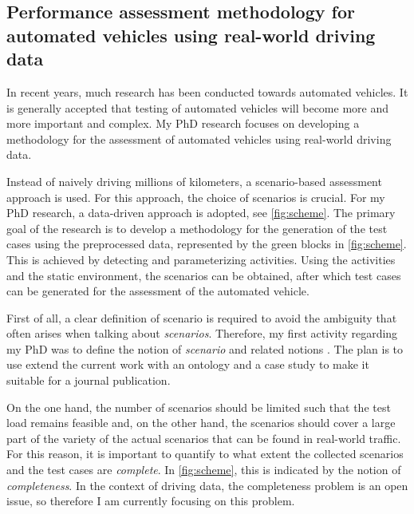 \documentclass[10pt,final,a4paper,oneside,onecolumn]{article}
\begin{document}
\subsection*{Performance assessment methodology for automated vehicles using real-world driving data}

In recent years, much research has been conducted towards automated vehicles. It is generally accepted that testing of automated vehicles will become more and more important and complex. My PhD research focuses on developing a methodology for the assessment of automated vehicles using real-world driving data.

Instead of naively driving millions of kilometers, a scenario-based assessment approach is used. For this approach, the choice of scenarios is crucial. For my PhD research, a data-driven approach is adopted, see \cref{fig:scheme}. The primary goal of the research is to develop a methodology for the generation of the test cases using the preprocessed data, represented by the green blocks in \cref{fig:scheme}. This is achieved by detecting and parameterizing activities. Using the activities and the static environment, the scenarios can be obtained, after which test cases can be generated for the assessment of the automated vehicle.

First of all, a clear definition of scenario is required to avoid the ambiguity that often arises when talking about \emph{scenarios}. Therefore, my first activity regarding my PhD was to define the notion of \emph{scenario} and related notions \cite{degelder2018ontology}. The plan is to use extend the current work \cite{degelder2018ontology} with an ontology and a case study to make it suitable for a journal publication.

On the one hand, the number of scenarios should be limited such that the test load remains feasible and, on the other hand, the scenarios should cover a large part of the variety of the actual scenarios that can be found in real-world traffic. For this reason, it is important to quantify to what extent the collected scenarios and the test cases are \emph{complete}. In \cref{fig:scheme}, this is indicated by the notion of \emph{completeness}. In the context of driving data, the completeness problem is an open issue, so therefore I am currently focusing on this problem. 
\end{document}
